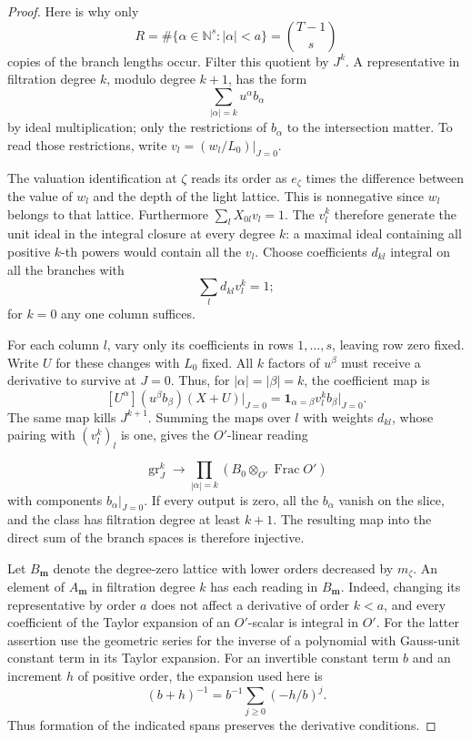 \begin{proof}
Here is why only
\[
               R=\#\{\alpha\in\mathbb N^s:|\alpha|<a\}
                      =\binom{T-1}{s}
\]
copies of the branch lengths occur. Filter this quotient by
\(J^k\). A representative in filtration degree \(k\), modulo
degree \(k+1\), has the form 
\[
  \sum_{|\alpha|=k}u^\alpha b_\alpha
\]
by ideal multiplication; only the restrictions of \(b_\alpha\)
to the intersection matter. To read those restrictions, write
\(v_l=(w_l/L_0)|_{J=0}\).

The valuation identification at
\(\zeta\) reads its order as \(e_\zeta\) times the difference
between the value of \(w_l\) and the depth of the light lattice.
This is nonnegative since \(w_l\) belongs to that lattice.
Furthermore \(\sum_l X_{0l}v_l=1\). The \(v_l^k\) therefore
generate the unit ideal in the integral closure at every degree
\(k\): a maximal ideal containing all positive \(k\)-th powers
would contain all the \(v_l\). Choose coefficients \(d_{kl}\)
integral on all the branches with 
\[
  \sum_l d_{kl}v_l^k=1;
\]
for \(k=0\) any one column suffices.

For each column \(l\), vary only its coefficients in rows
\(1,\ldots,s\), leaving row zero fixed. Write \(U\) for these changes with \(L_0\) fixed. All \(k\)
factors of \(u^\beta\) must receive a derivative to survive
at \(J=0\). Thus, for \(|\alpha|=|\beta|=k\), the coefficient map is
\[
  [U^\alpha](u^\beta b_\beta)(X+U)\big|_{J=0}
        =\mathbf1_{\alpha=\beta}v_l^k b_\beta\big|_{J=0}.
\]
The same map kills \(J^{k+1}\). Summing the maps over \(l\)
with weights \(d_{kl}\), whose pairing with \((v_l^k)_l\)
is one, gives the \(O'\)-linear reading

\[
  \operatorname{gr}^k_J\to\prod_{|\alpha|=k} (B_0\otimes_{O'}\operatorname{Frac} O')
\]
with components \(b_\alpha|_{J=0}\).
If every output is zero, all the \(b_\alpha\) vanish on the
slice, and the class has filtration degree at least \(k+1\).
The resulting map into the direct sum of the branch spaces is
therefore injective.

Let \(B_{\boldsymbol m}\) denote the degree-zero lattice
with lower orders decreased by \(m_\zeta\). An element of
\(A_{\boldsymbol m}\) in filtration degree \(k\) has each
reading in \(B_{\boldsymbol m}\). Indeed, changing its
representative by order \(a\) does not affect a derivative
of order \(k<a\), and every coefficient of the Taylor
expansion of an \(O'\)-scalar is integral in \(O'\).
For the latter assertion use the geometric series for the
inverse of a polynomial with Gauss-unit constant term in its
Taylor expansion.
For an invertible constant term \(b\) and an increment \(h\) of positive order, the expansion used here is
\[
  (b+h)^{-1}=b^{-1}\sum_{j\ge0}(-h/b)^j .
\]
 Thus formation of the indicated spans
preserves the derivative conditions.


\end{proof}
